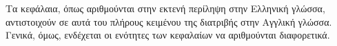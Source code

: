 Τα κεφάλαια, όπως αριθμούνται στην εκτενή περίληψη στην Ελληνική γλώσσα, αντιστοιχούν σε αυτά του πλήρους κειμένου της διατριβής στην Αγγλική γλώσσα. Γενικά, όμως, ενδέχεται οι ενότητες των κεφαλαίων να αριθμούνται διαφορετικά. 









